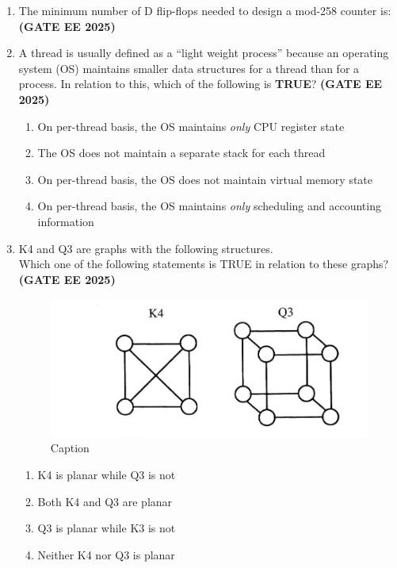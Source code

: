 \documentclass[journal,12pt,onecolumn]{IEEEtran}
\theoremstyle{remark}
\begin{document}
\begin{enumerate}
\item  The minimum number of D flip-flops needed to design a mod-258 counter is: \hfill \textbf{(GATE EE 2025)}
\begin{enumerate}
\end{enumerate}



\item  A thread is usually defined as a ``light weight process'' because an operating system (OS) maintains smaller data structures for a thread than for a process. In relation to this, which of the following is \textbf{TRUE}? \hfill \textbf{(GATE EE 2025)}
\begin{enumerate}
\item  On per-thread basis, the OS maintains \textit{only} CPU register state
\item   The OS does not maintain a separate stack for each thread
\item   On per-thread basis, the OS does not maintain virtual memory state
\item   On per-thread basis, the OS maintains \textit{only} scheduling and accounting information
\end{enumerate}




\item K4 and Q3 are graphs with the following structures.
\\
Which one of the following statements is TRUE in relation to these graphs? \hfill \textbf{(GATE EE 2025)}
\begin{figure}
    \centering
    \includegraphics[width=0.5\linewidth]{figs/fig2.png}
    \caption{Caption}
    \label{fig:placeholder}
\end{figure}
\begin{enumerate}
  \item K4 is planar while Q3 is not
  \item Both K4 and Q3 are planar
  \item Q3 is planar while K3 is not
  \item  Neither K4 nor Q3 is planar
\end{enumerate}



\end{enumerate}
\end{document}
